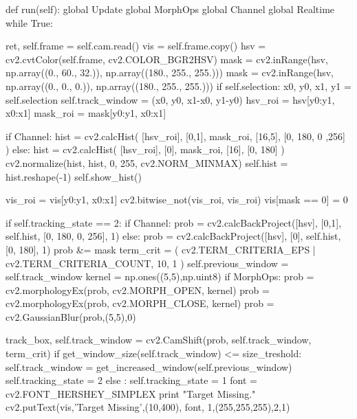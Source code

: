 \documentclass{article}
\begin{document}
\begin{python}
    def run(self):
        global Update
        global MorphOps
        global Channel
        global Realtime
        while True:

            ret, self.frame = self.cam.read()
            vis = self.frame.copy()
            hsv = cv2.cvtColor(self.frame, cv2.COLOR_BGR2HSV)
            mask = cv2.inRange(hsv, np.array((0., 60., 32.)), np.array((180., 255., 255.)))
            mask = cv2.inRange(hsv, np.array((0., 0., 0.)), np.array((180., 255., 255.)))
            if self.selection:
                x0, y0, x1, y1 = self.selection
                self.track_window = (x0, y0, x1-x0, y1-y0)
                hsv_roi = hsv[y0:y1, x0:x1]
                mask_roi = mask[y0:y1, x0:x1]
                
                if Channel:
                    hist = cv2.calcHist( [hsv_roi], [0,1], mask_roi, [16,5], [0, 180, 0 ,256] )
                else:
                    hist = cv2.calcHist( [hsv_roi], [0], mask_roi, [16], [0, 180] )
                cv2.normalize(hist, hist, 0, 255, cv2.NORM_MINMAX)
                self.hist = hist.reshape(-1)
                self.show_hist()

                vis_roi = vis[y0:y1, x0:x1]
                cv2.bitwise_not(vis_roi, vis_roi)
                vis[mask == 0] = 0

            if self.tracking_state == 2:
                if Channel:
                    prob = cv2.calcBackProject([hsv], [0,1], self.hist, [0, 180, 0, 256], 1)
                else:
                    prob = cv2.calcBackProject([hsv], [0], self.hist, [0, 180], 1)
                prob &= mask
                term_crit = ( cv2.TERM_CRITERIA_EPS | cv2.TERM_CRITERIA_COUNT, 10, 1 )
                self.previous_window = self.track_window
                kernel = np.ones((5,5),np.uint8)
                if MorphOps:
                    prob = cv2.morphologyEx(prob, cv2.MORPH_OPEN, kernel)
                    prob = cv2.morphologyEx(prob, cv2.MORPH_CLOSE, kernel)
                prob = cv2.GaussianBlur(prob,(5,5),0)

                track_box, self.track_window = cv2.CamShift(prob, self.track_window, term_crit)
                if get_window_size(self.track_window) <= size_treshold:
                    self.track_window = get_increased_window(self.previous_window)
                    self.tracking_state = 2
                else :
                    self.tracking_state = 1
                font = cv2.FONT_HERSHEY_SIMPLEX
                print "Target Missing."
                cv2.putText(vis,'Target Missing',(10,400), font, 1,(255,255,255),2,1)


\end{python}
\end{document}
